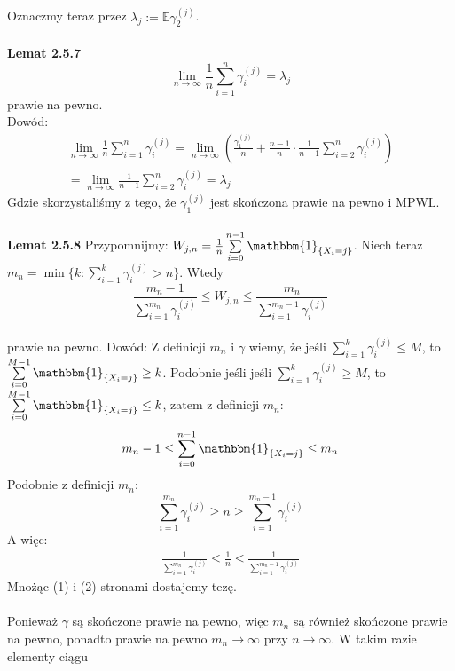 \documentclass[a4paper]{article}
\begin{document}
\\\\
Oznaczmy teraz przez $\lambda_j := \mathbb{E}\gamma_2^{(j)}$.\\\\
\textbf{Lemat 2.5.7}
$$\lim\limits_{n \to \infty} \frac{1}{n} \sum\limits_{i = 1}^n \gamma_i^{(j)} = \lambda_j$$
prawie na pewno.\\
Dowód: 
\begin{align*}
    \lim\limits_{n \to \infty} \frac{1}{n} \sum\limits_{i = 1}^n \gamma_i^{(j)} = 
    \lim\limits_{n \to \infty} \left(\frac{\gamma_1^{(j)}}{n} + \frac{n-1}{n}\cdot\frac{1}{n-1} \sum\limits_{i = 2}^n \gamma_i^{(j)}\right)\\
    = \lim\limits_{n \to \infty} \frac{1}{n-1} \sum\limits_{i = 2}^n \gamma_i^{(j)} = \lambda_j
\end{align*}
Gdzie skorzystaliśmy z tego, że $\gamma_1^{(j)}$ jest skończona prawie na pewno i MPWL.\\
\\
\textbf{Lemat 2.5.8}
Przypomnijmy: $W_{j, n} = \frac{1}{n}\sum\limits_{i = 0}^{n-1} \mathbbm{1}_{\{X_i = j\}}$. Niech teraz $m_n = \min \{k: \sum\limits_{i=1}^k \gamma_i^{(j)} > n\}$. Wtedy
$$ \frac{m_n - 1}{\sum\limits_{i=1}^{m_n} \gamma_i^{(j)}} \leq W_{j, n}  \leq \frac{m_n}{\sum\limits_{i=1}^{m_n-1} \gamma_i^{(j)}}$$\\
prawie na pewno.
Dowód: Z definicji $m_n$ i $\gamma$ wiemy, że jeśli $\sum\limits_{i=1}^k \gamma_i^{(j)} \leq M$, to $\sum\limits_{i = 0}^{M-1} \mathbbm{1}_{\{X_i = j\}} \geq k$. Podobnie jeśli jeśli $\sum\limits_{i=1}^k \gamma_i^{(j)} \geq M$, to $\sum\limits_{i = 0}^{M-1} \mathbbm{1}_{\{X_i = j\}} \leq k$, zatem z definicji $m_n$:
\begin{align}
m_n - 1 \leq \sum\limits_{i = 0}^{n-1} \mathbbm{1}_{\{X_i = j\}} \leq m_n
\end{align}
Podobnie z definicji $m_n$:
$$\sum\limits_{i=1}^{m_n} \gamma_i^{(j)} \geq n \geq \sum\limits_{i=1}^{m_n - 1} \gamma_i^{(j)}$$
A więc:
\begin{align}
     \frac{1}{\sum\limits_{i=1}^{m_n} \gamma_i^{(j)}} \leq \frac{1}{n} \leq \frac{1}{\sum\limits_{i=1}^{m_n - 1} \gamma_i^{(j)}}
\end{align}
Mnożąc (1) i (2) stronami dostajemy tezę.
\\\\
Ponieważ $\gamma$ są skończone prawie na pewno, więc $m_n$ są również skończone prawie na pewno, ponadto prawie na pewno $m_n \to \infty$ przy $n \to \infty$. W takim razie elementy ciągu 
\end{document}
